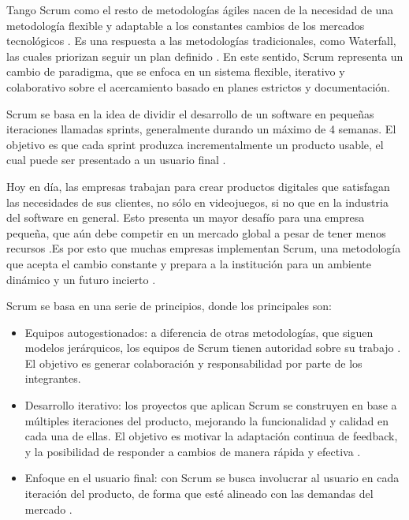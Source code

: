 \par Tango Scrum como el resto de metodologías ágiles nacen de la necesidad de una metodología flexible y adaptable a los constantes cambios de los mercados tecnológicos \cite{bartoszScrumVideoGames2023}. Es una respuesta a las metodologías tradicionales, como Waterfall, las cuales priorizan seguir un plan definido \cite{cynthiachizobaekechiEnhancingAgileProduct2024}. En este sentido, Scrum representa un cambio de paradigma, que se enfoca en un sistema flexible, iterativo y colaborativo sobre el acercamiento basado en planes estrictos y documentación.
\par Scrum se basa en la idea de dividir el desarrollo de un software en pequeñas iteraciones llamadas sprints, generalmente durando un máximo de 4 semanas. El objetivo es que cada sprint produzca incrementalmente un producto usable, el cual puede ser presentado a un usuario final \cite{bartoszScrumVideoGames2023}.
\par Hoy en día, las empresas trabajan para crear productos digitales que satisfagan las necesidades de sus clientes, no sólo en videojuegos, si no que en la industria del software en general. Esto presenta un mayor desafío para una empresa pequeña, que aún debe competir en un mercado global a pesar de tener menos recursos \cite{putrianasariProblemsAdoptionAgileScrum2024}.Es por esto que muchas empresas implementan Scrum, una metodología que acepta el cambio constante y prepara a la institución para un ambiente dinámico y un futuro incierto \cite{putrianasariProblemsAdoptionAgileScrum2024}.
\par Scrum se basa en una serie de principios, donde los principales son:
\begin{itemize}
  \item Equipos autogestionados: a diferencia de otras metodologías, que siguen modelos jerárquicos, los equipos de Scrum tienen autoridad sobre su trabajo \cite{cynthiachizobaekechiEnhancingAgileProduct2024}. El objetivo es generar colaboración y responsabilidad por parte de los integrantes.
  \item Desarrollo iterativo: los proyectos que aplican Scrum se construyen en base a múltiples iteraciones del producto, mejorando la funcionalidad y calidad en cada una de ellas. El objetivo es motivar la adaptación continua de feedback, y la posibilidad de responder a cambios de manera rápida y efectiva \cite{cynthiachizobaekechiEnhancingAgileProduct2024}.
  \item Enfoque en el usuario final: con Scrum se busca involucrar al usuario en cada iteración del producto, de forma que esté alineado con las demandas del mercado \cite{cynthiachizobaekechiEnhancingAgileProduct2024}.
\end{itemize}
%
%
